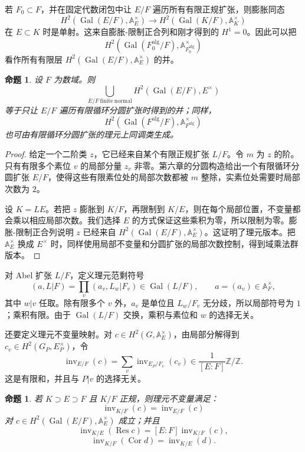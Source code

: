 \documentclass[11pt,a4paper,openany]{ctexbook}
\numberwithin{equation}{chapter}
\newcommand{\Z}{\mathbb{Z}}
\newcommand{\A}{\mathbb{A}}
\newcommand{\Gal}{\operatorname{Gal}}
\theoremstyle{plain}
\newtheorem{proposition}[theorem]{命题}
\theoremstyle{definition}
\theoremstyle{remark}
\begin{document}
若 $F_0\subset F$，并在固定代数闭包中让 $E/F$ 遍历所有有限正规扩张，则膨胀同态
\[
H^2(\Gal(E/F),\A_E^\times)\to H^2(\Gal(K/F),\A_K^\times)
\]
在 $E\subset K$ 时是单射。这来自膨胀-限制正合列和刚才得到的 $H^1=0$。因此可以把
\[
H^2(\Gal(F_0^{\mathrm{alg}}/F),\A_{F_0^{\mathrm{alg}}}^\times)
\]
看作所有有限层 $H^2(\Gal(E/F),\A_E^\times)$ 的并。

\begin{proposition}
设 $F$ 为数域。则
\[
\bigcup_{E/F\ \mathrm{finite\ normal}}H^2(\Gal(E/F),E^\times)
\]
等于只让 $E/F$ 遍历有限循环分圆扩张时得到的并；同样，
\[
H^2(\Gal(F^{\mathrm{alg}}/F),\A_{F^{\mathrm{alg}}}^\times)
\]
也可由有限循环分圆扩张的理元上同调类生成。
\end{proposition}

\begin{proof}
给定一个二阶类 $z$，它已经来自某个有限正规扩张 $L/F$。令 $m$ 为 $z$ 的阶。只有有限多个素位 $v$ 的局部分量 $z_v$ 非零。第六章的分圆构造给出一个有限循环分圆扩张 $E/F$，使得这些有限素位处的局部次数都被 $m$ 整除，实素位处需要时局部次数为 $2$。

设 $K=LE$。若把 $z$ 膨胀到 $K/F$，再限制到 $K/E$，则在每个局部位置，不变量都会乘以相应局部次数。我们选择 $E$ 的方式保证这些乘积为零，所以限制为零。膨胀-限制正合列说明 $z$ 已经来自 $H^2(\Gal(E/F),\A_E^\times)$。这证明了理元版本。把 $\A_E^\times$ 换成 $E^\times$ 时，同样使用局部不变量和分圆扩张的局部次数控制，得到域乘法群版本。
\end{proof}

对 Abel 扩张 $L/F$，定义理元范剩符号
\[
(a,L|F)=\prod_v(a_v,L_w|F_v)\in \Gal(L/F),\qquad a=(a_v)\in\A_F^\times,
\]
其中 $w|v$ 任取。除有限多个 $v$ 外，$a_v$ 是单位且 $L_w/F_v$ 无分歧，所以局部符号为 $1$；乘积有限。由于 $\Gal(L/F)$ 交换，乘积与素位和 $w$ 的选择无关。

还要定义理元不变量映射。对 $c\in H^2(G,\A_E^\times)$，由局部分解得到 $c_v\in H^2(G_P,E_P^\times)$，令
\[
\operatorname{inv}_{E/F}(c)=\sum_v\operatorname{inv}_{E_P/F_v}(c_v)\in\frac1{[E:F]}\Z/\Z.
\]
这是有限和，并且与 $P|v$ 的选择无关。

\begin{proposition}
若 $K\supset E\supset F$ 且 $K/F$ 正规，则理元不变量满足：
\[
\operatorname{inv}_{K/F}(c)=\operatorname{inv}_{E/F}(c)
\]
对 $c\in H^2(\Gal(E/F),\A_E^\times)$ 成立；并且
\[
\operatorname{inv}_{K/E}(\operatorname{Res}c)=[E:F]\operatorname{inv}_{K/F}(c),
\]
\[
\operatorname{inv}_{K/F}(\operatorname{Cor}d)=\operatorname{inv}_{K/E}(d).
\]
\end{proposition}
\end{document}
